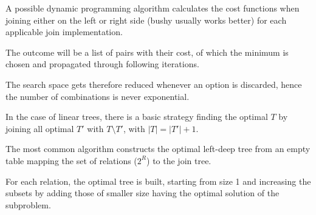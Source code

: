 A possible dynamic programming algorithm calculates the cost functions when joining either on the left or right side (bushy usually works better) for each applicable join implementation. 

The outcome will be a list of pairs with their cost, of which the minimum is chosen and propagated through following iterations.

The search space gets therefore reduced whenever an option is discarded, hence the number of combinations is never exponential.

In the case of linear trees, there is a basic strategy finding the optimal $T$ by joining all optimal $T'$ with $T \setminus T'$, with $|T| = |T'| + 1$.

The most common algorithm constructs the optimal left-deep tree from an empty table mapping the set of relations ($2^R$) to the join tree. 

For each relation, the optimal tree is built, starting from size 1 and increasing the subsets by adding those of smaller size having the optimal solution of the subproblem.


